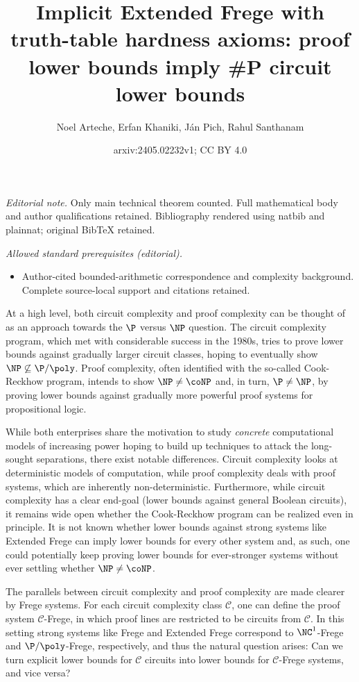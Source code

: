 \documentclass[11pt]{article}
\title{Implicit Extended Frege with truth-table hardness axioms: proof lower bounds imply \#P circuit lower bounds}
\author{Noel Arteche, Erfan Khaniki, Ján Pich, Rahul Santhanam}
\date{arxiv:2405.02232v1; CC BY 4.0}
\theoremstyle{definition}
\theoremstyle{plain}
\theoremstyle{remark}
\newcommand{\calC}{\mathcal{C}}
\begin{document}
\maketitle
\noindent\textit{Editorial note.} Only main technical theorem counted. Full mathematical body and author qualifications retained. Bibliography rendered using natbib and plainnat; original BibTeX retained.\par\medskip
\noindent\textit{Allowed standard prerequisites (editorial).}\begin{itemize}
\item Author-cited bounded-arithmetic correspondence and complexity background. Complete source-local support and citations retained.
\end{itemize}\medskip
At a high level, both circuit complexity and proof complexity can be thought of as an approach towards the $\P$ versus $\NP$ question. The circuit complexity program, which met with considerable success in the 1980s, tries to prove lower bounds against gradually larger circuit classes, hoping to eventually show $\NP \not\subseteq \P/\poly$. Proof complexity, often identified with the so-called Cook-Reckhow program, intends to show $\NP \neq \coNP$ and, in turn, $\P \neq \NP$, by proving lower bounds against gradually more powerful proof systems for propositional logic.

While both enterprises share the motivation to study \emph{concrete} computational models of increasing power hoping to build up techniques to attack the long-sought separations, there exist notable differences. Circuit complexity looks at deterministic models of computation, while proof complexity deals with proof systems, which are inherently non-deterministic. Furthermore, while circuit complexity has a clear end-goal (lower bounds against general Boolean circuits), it remains wide open whether the Cook-Reckhow program can be realized even in principle. It is not known whether lower bounds against strong systems like Extended Frege can imply lower bounds for every other system and, as such, one could potentially keep proving lower bounds for ever-stronger systems without ever settling whether $\NP \neq \coNP$.

The parallels between circuit complexity and proof complexity are made clearer by Frege systems. For each circuit complexity class $\calC$, one can define the proof system $\calC$-Frege, in which proof lines are restricted to be circuits from $\calC$. In this setting strong systems like Frege and Extended Frege correspond to $\NC^1$-Frege and $\P/\poly$-Frege, respectively, and thus the natural question arises: Can we turn explicit lower bounds for $\calC$ circuits into lower bounds for $\calC$-Frege systems, and vice versa?
\end{document}
